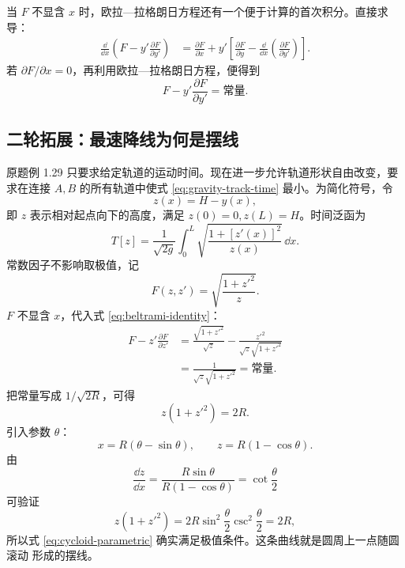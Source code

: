 \documentclass[UTF8,zihao=-4,oneside,openany]{ctexbook}
\begin{document}
当 $F$ 不显含 $x$ 时，欧拉—拉格朗日方程还有一个便于计算的首次积分。直接求导：
\begin{align*}
  \frac{\dd}{\dd x}\left(F-y'\frac{\partial F}{\partial y'}\right)
  &=\frac{\partial F}{\partial x}
  +y'\left[
    \frac{\partial F}{\partial y}
    -\frac{\dd}{\dd x}\left(\frac{\partial F}{\partial y'}\right)
  \right].
\end{align*}
若 $\partial F/\partial x=0$，再利用欧拉—拉格朗日方程，便得到
\begin{equation}
  F-y'\frac{\partial F}{\partial y'}=\text{常量}.
  \label{eq:beltrami-identity}
\end{equation}

\subsection{二轮拓展：最速降线为何是摆线}

原题例 1.29 只要求给定轨道的运动时间。现在进一步允许轨道形状自由改变，要求在连接
$A,B$ 的所有轨道中使式 \eqref{eq:gravity-track-time} 最小。为简化符号，令
\begin{equation}
  z(x)=H-y(x),
  \label{eq:downward-coordinate}
\end{equation}
即 $z$ 表示相对起点向下的高度，满足 $z(0)=0,z(L)=H$。时间泛函为
\begin{equation}
  T[z]=\frac1{\sqrt{2g}}\int_0^L
  \sqrt{\frac{1+[z'(x)]^2}{z(x)}}\,\dd x.
  \label{eq:brachistochrone-functional}
\end{equation}
常数因子不影响取极值，记
\[
  F(z,z')=\sqrt{\frac{1+z'^2}{z}}.
\]
$F$ 不显含 $x$，代入式 \eqref{eq:beltrami-identity}：
\begin{align*}
  F-z'\frac{\partial F}{\partial z'}
  &=\frac{\sqrt{1+z'^2}}{\sqrt z}
  -\frac{z'^2}{\sqrt z\sqrt{1+z'^2}}\\
  &=\frac1{\sqrt z\sqrt{1+z'^2}}
  =\text{常量}.
\end{align*}
把常量写成 $1/\sqrt{2R}$，可得
\begin{equation}
  z(1+z'^2)=2R.
  \label{eq:brachistochrone-first-integral}
\end{equation}
引入参数 $\theta$：
\begin{equation}
  x=R(\theta-\sin\theta),
  \qquad
  z=R(1-\cos\theta).
  \label{eq:cycloid-parametric}
\end{equation}
由
\[
  \frac{\dd z}{\dd x}
  =\frac{R\sin\theta}{R(1-\cos\theta)}
  =\cot\frac\theta2
\]
可验证
\[
  z(1+z'^2)
  =2R\sin^2\frac\theta2\csc^2\frac\theta2
  =2R,
\]
所以式 \eqref{eq:cycloid-parametric} 确实满足极值条件。这条曲线就是圆周上一点随圆滚动
形成的摆线。
\end{document}
